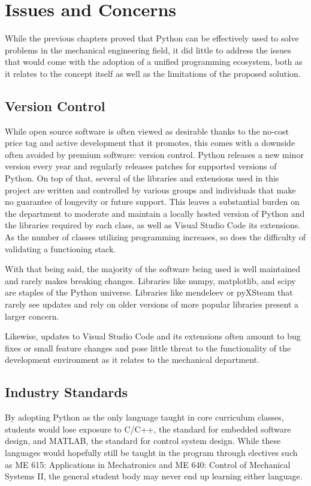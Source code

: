 \section{Issues and Concerns}

While the previous chapters proved that Python can be effectively
used to solve problems in the mechanical engineering field, it did 
little to address the issues that would come with the adoption 
of a unified programming ecosystem, both as it relates to the
concept itself as well as the limitations of the proposed solution.

\subsection{Version Control}

While open source software is often viewed as desirable
thanks to the no-cost price tag and active development that it 
promotes, this comes with a downside often avoided by premium
software: version control. Python releases a new minor version
every year and regularly releases patches for supported versions
of Python. On top of that, several of the libraries and extensions 
used in this project are written and controlled by various 
groups and individuals that make no guarantee of longevity or future
support. This leaves a substantial burden on the department to
moderate and maintain a locally hosted version of Python and the
libraries required by each class, as well as Visual Studio Code
its extensions. As the number of classes utilizing programming
increases, so does the difficulty of validating a functioning stack.

With that being said, the majority of the software being used is well
maintained and rarely makes breaking changes. Libraries like numpy,
matplotlib, and scipy are staples of the Python universe. Libraries
like mendeleev or pyXSteam that rarely see updates and rely on older
versions of more popular libraries present a larger concern.

Likewise, updates to Visual Studio Code and its extensions often
amount to bug fixes or small feature changes and pose little threat
to the functionality of the development environment as it relates to
the mechanical department.

\subsection{Industry Standards}

By adopting Python as the only language taught in core curriculum
classes, students would lose exposure to C/C++, the standard for 
embedded software design, and MATLAB, the standard for control system
design. While these languages would hopefully still be taught in the
program through electives such as ME 615: Applications in Mechatronics 
and ME 640: Control of Mechanical Systems II, the general student body
may never end up learning either language. 

